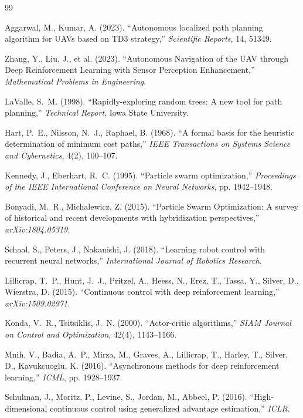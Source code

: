 \begin{thebibliography}{99}

Aggarwal, M., Kumar, A. (2023).
``Autonomous localized path planning algorithm for UAVs based on TD3 strategy,''
\textit{Scientific Reports}, 14, 51349.

Zhang, Y., Liu, J., et al. (2023).
``Autonomous Navigation of the UAV through Deep Reinforcement Learning with Sensor Perception Enhancement,''
\textit{Mathematical Problems in Engineering}.

LaValle, S.~M. (1998).
``Rapidly-exploring random trees: A new tool for path planning,''
\textit{Technical Report}, Iowa State University.

Hart, P.~E., Nilsson, N.~J., Raphael, B. (1968).
``A formal basis for the heuristic determination of minimum cost paths,''
\textit{IEEE Transactions on Systems Science and Cybernetics}, 4(2), 100--107.

Kennedy, J., Eberhart, R.~C. (1995).
``Particle swarm optimization,''
\textit{Proceedings of the IEEE International Conference on Neural Networks}, pp. 1942--1948.

Bonyadi, M.~R., Michalewicz, Z. (2015).
``Particle Swarm Optimization: A survey of historical and recent developments with hybridization perspectives,''
\textit{arXiv:1804.05319}.

Schaal, S., Peters, J., Nakanishi, J. (2018).
``Learning robot control with recurrent neural networks,''
\textit{International Journal of Robotics Research}.

Lillicrap, T.~P., Hunt, J.~J., Pritzel, A., Heess, N., Erez, T., Tassa, Y., Silver, D., Wierstra, D. (2015).
``Continuous control with deep reinforcement learning,''
\textit{arXiv:1509.02971}.

Konda, V.~R., Tsitsiklis, J.~N. (2000).
``Actor-critic algorithms,''
\textit{SIAM Journal on Control and Optimization}, 42(4), 1143--1166.

Mnih, V., Badia, A.~P., Mirza, M., Graves, A., Lillicrap, T., Harley, T., Silver, D., Kavukcuoglu, K. (2016).
``Asynchronous methods for deep reinforcement learning,''
\textit{ICML}, pp. 1928--1937.

Schulman, J., Moritz, P., Levine, S., Jordan, M., Abbeel, P. (2016).
``High-dimensional continuous control using generalized advantage estimation,''
\textit{ICLR}.


\end{thebibliography}
